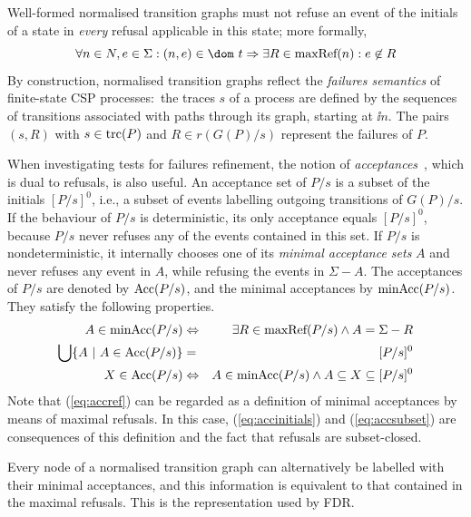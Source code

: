 Well-formed normalised transition graphs must not refuse an event of the
initials of a state in {\it every} refusal applicable in this state; more
formally,
%
\begin{equation}
\label{eq:wellformedg}
\forall n\in N, e\in\Sigma: (n,e)\in\dom~t \Rightarrow
\exists R\in \maxrefs(n): e\not\in R
\end{equation}
%
By construction, normalised transition graphs reflect the \emph{failures
semantics} of finite-state CSP processes:~the traces $s$ of a process are
defined by the sequences of transitions associated with paths through its
graph, starting at $\ii n$. The pairs $(s,R)$ with $s\in\text{trc}(P)$ and $R\in
r(G(P)/s)$ represent the failures of $P$.

When investigating  tests for failures refinement, the notion of
\emph{acceptances}~\cite{Hennessy:1988:ATP:50497}, which is dual to refusals,
is also useful. An acceptance set of $P/s$ is a subset of the initials
$[P/s]^0$, i.e., a subset of events labelling  outgoing transitions of
$G(P)/s$. If the behaviour of  $P/s$ is deterministic, its only acceptance
equals $[P/s]^0$, because $P/s$ never refuses any of the events contained in
this set. If $P/s$ is nondeterministic, it internally chooses one of its
\emph{minimal acceptance sets} $A$ and never refuses any event in $A$, while
refusing the events in $\Sigma-A$. The acceptances of $P/s$ are denoted by
$\text{Acc}(P/s)$, and the minimal acceptances by $\text{minAcc}(P/s)$. They satisfy
the following properties.
%
\begin{eqnarray}
A\in \text{minAcc}(P/s) & \Leftrightarrow & \exists R\in\text{maxRef}(P/s) \wedge A = \Sigma-R
\label{eq:accref}
\\
\bigcup \{ A~|~A\in \text{Acc}(P/s)\} & = & [P/s]^0
\label{eq:accinitials}
\\
 X\in\text{Acc}(P/s) &\Leftrightarrow & A\in \text{minAcc}(P/s) \wedge A\subseteq X \subseteq [P/s]^0
 \label{eq:accsubset}
\end{eqnarray}
%
Note that (\ref{eq:accref}) can be regarded as a definition of minimal
acceptances by means of maximal refusals. In this case,
(\ref{eq:accinitials}) and (\ref{eq:accsubset}) are consequences of this
definition and the fact that refusals are subset-closed. 

Every node of a normalised transition graph can alternatively be labelled
with their minimal acceptances, and this information is equivalent to that
contained in the maximal refusals. This is the representation used by FDR.

